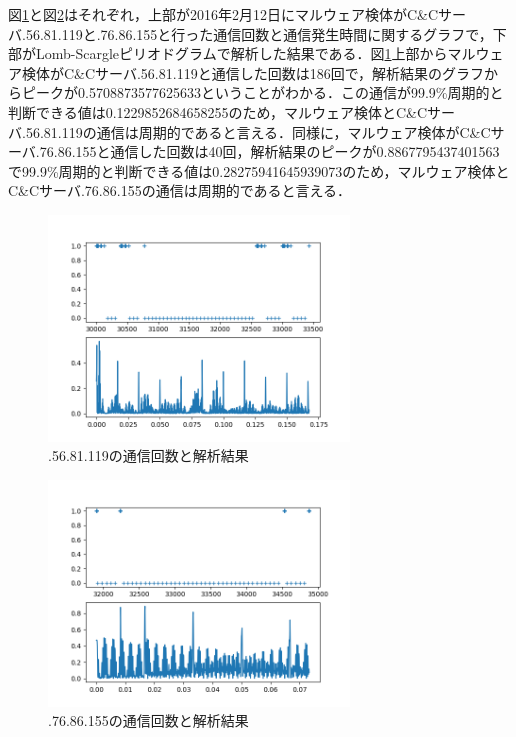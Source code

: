 \documentclass[twocolumn]{ltjsarticle}
\begin{document}
図\ref{fig:e12_result1}と図\ref{fig:e12_result2}はそれぞれ，上部が2016年2月12日にマルウェア検体がC\&Cサーバ\ast\ast\ast.56.81.119と\ast\ast\ast.76.86.155と行った通信回数と通信発生時間に関するグラフで，下部がLomb-Scargleピリオドグラムで解析した結果である．図\ref{fig:e12_result1}上部からマルウェア検体がC\&Cサーバ\ast\ast\ast.56.81.119と通信した回数は186回で，解析結果のグラフからピークが0.5708873577625633ということがわかる．この通信が99.9\%周期的と判断できる値は0.1229852684658255のため，マルウェア検体とC\&Cサーバ\ast\ast\ast.56.81.119の通信は周期的であると言える．同様に，マルウェア検体がC\&Cサーバ\ast\ast\ast.76.86.155と通信した回数は40回，解析結果のピークが0.8867795437401563で99.9\%周期的と判断できる値は0.28275941645939073のため，マルウェア検体とC\&Cサーバ\ast\ast\ast.76.86.155の通信は周期的であると言える．
\begin{figure}[htbp]
  \centering
  \includegraphics[width=8cm]{images/20201214_修士論文予稿/e12_c2_1.png}
  \caption{\ast\ast\ast.56.81.119の通信回数と解析結果}
  \label{fig:e12_result1}
\end{figure}
\begin{figure}[htbp]
  \centering
  \includegraphics[width=8cm]{images/20201214_修士論文予稿/e12_c2_2.png}
  \caption{\ast\ast\ast.76.86.155の通信回数と解析結果}
  \label{fig:e12_result2}
\end{figure}
\end{document}
